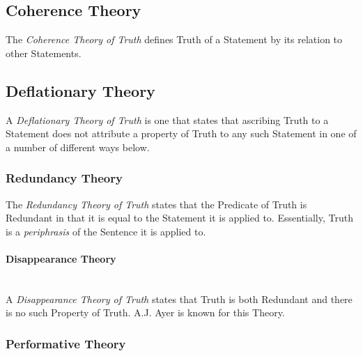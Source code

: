 \documentclass{article}
\begin{document}
\subsection{Coherence Theory}

The \emph{Coherence Theory of Truth} defines Truth of a Statement by
its relation to other Statements.

\subsection{Deflationary Theory}\label{subsec:deflationary_truth}

A \emph{Deflationary Theory of Truth} is one that states that
ascribing Truth to a Statement does not attribute a property of Truth
to any such Statement in one of a number of different ways below.

\subsubsection{Redundancy Theory}

The \emph{Redundancy Theory of Truth} states that the Predicate of
Truth is Redundant in that it is equal to the Statement it is applied
to.\cite{ramsey27} Essentially, Truth is a \emph{periphrasis} of the
Sentence it is applied to.

\paragraph{Disappearance Theory}
\hfill \\ A \emph{Disappearance Theory of Truth} states that Truth is
both Redundant and there is no such Property of Truth. A.J. Ayer is
known for this Theory.

\subsubsection{Performative Theory}
\end{document}
